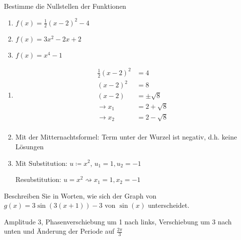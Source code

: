  Bestimme die Nullstellen der Funktionen
\begin{multicols}{3}
  \begin{enumerate}
    \item $f(x) = \frac 1 2 (x-2)^2 -4$
    \item $f(x) = 3x^2-2x+2$
    \item $f(x) = x^4-1$
  \end{enumerate}
\end{multicols}
\clearpage
\begin{lsg}{}
  \begin{multicols}{3}
    \begin{enumerate}
      \item \begin{align*}
        \frac 1 2 (x-2)^2 &= 4\\
        (x-2)^2 &= 8\\
        (x-2)&=\pm\sqrt 8\\
        \rightarrow x_1&=2+\sqrt 8\\
        \rightarrow x_2&=2-\sqrt 8\\
      \end{align*}
      \columnbreak
      \item Mit der Mitternachtsformel: Term unter der Wurzel ist negativ, d.h. keine Lösungen
      \columnbreak
      \item Mit Substitution: $u\coloneqq x^2$, $u_1=1, u_2=-1$

			Resubstitution: $u=x^2 \rightsquigarrow x_1=1, x_2=-1$
    \end{enumerate}
  \end{multicols}
\end{lsg}



	Beschreiben Sie in Worten, wie sich der Graph von $g(x)=3\sin(3(x+1))-3$ von $\sin(x)$ unterscheidet.
\begin{lsg}{}
	Amplitude 3, Phasenverschiebung um 1 nach links, Verschiebung um 3 nach unten und Änderung der Periode auf $\frac{2\pi}{3}$
\end{lsg}


